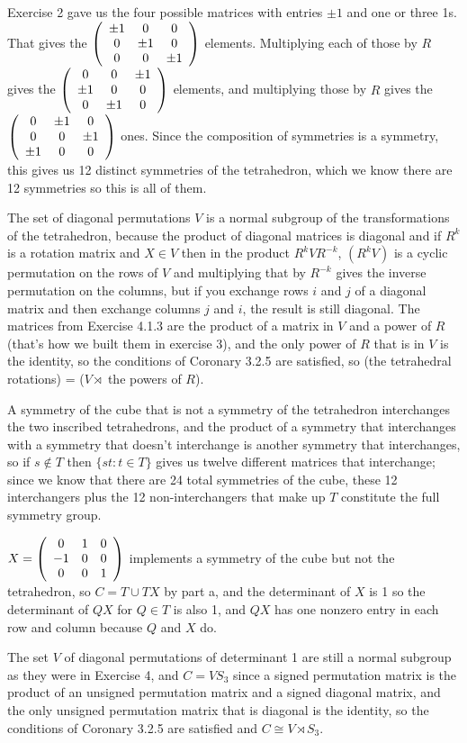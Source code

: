 \documentclass[11pt, oneside]{article}   	%
\begin{document}
\item Exercise 2 gave us the four possible matrices with entries $\pm 1$ and one or three 1s. That gives the $\left( \begin{array}{ccc} \pm1 & 0 & 0 \\ 0 & \pm 1 & 0 \\ 0 & 0 & \pm 1 \end{array} \right)$ elements. Multiplying each of those by $R$ gives the $\left( \begin{array}{ccc} 0 & 0 & \pm1 \\ \pm1 & 0 & 0 \\ 0 & \pm1 & 0 \end{array} \right)$ elements, and multiplying those by $R$ gives the $\left( \begin{array}{ccc} 0 & \pm1 & 0 \\ 0 & 0 & \pm1 \\ \pm1 & 0 & 0 \end{array} \right)$ ones. Since the composition of symmetries is a symmetry, this gives us 12 distinct symmetries of the tetrahedron, which we know there are 12 symmetries so this is all of them.
\item The set of diagonal permutations $V$ is a normal subgroup of the transformations of the tetrahedron, because the product of diagonal matrices is diagonal and if $R^k$ is a rotation matrix and $X \in V$ then in the product $R^kVR^{-k}$, $(R^kV)$ is a cyclic permutation on the rows of $V$ and multiplying that by $R^{-k}$ gives the inverse permutation on the columns, but if you exchange rows $i$ and $j$ of a diagonal matrix and then exchange columns $j$ and $i$, the result is still diagonal. The matrices from Exercise 4.1.3 are the product of a matrix in $V$ and a power of $R$ (that's how we built them in exercise 3), and the only power of $R$ that is in $V$ is the identity, so the conditions of Coronary 3.2.5 are satisfied, so (the tetrahedral rotations) = ($V \rtimes$ the powers of $R$).
\item \be
\item A symmetry of the cube that is not a symmetry of the tetrahedron interchanges the two inscribed tetrahedrons, and the product of a symmetry that interchanges with a symmetry that doesn't interchange is another symmetry that interchanges, so if $s\not\in T$ then $\{st : t \in T\}$ gives us twelve different matrices that interchange; since we know that there are 24 total symmetries of the cube, these 12 interchangers plus the 12 non-interchangers that make up $T$ constitute the full symmetry group.
\item $X = \left( \begin{array}{ccc} 0 & 1 & 0 \\ -1 & 0 & 0 \\ 0 & 0 & 1 \end{array} \right)$ implements a symmetry of the cube but not the tetrahedron, so $C = T \cup TX$ by part a, and the determinant of $X$ is 1 so the determinant of $QX$ for $Q \in T$ is also 1, and $QX$ has one nonzero entry in each row and column because $Q$ and $X$ do.
\item The set $V$ of diagonal permutations of determinant 1 are still a normal subgroup as they were in Exercise 4, and $C = V S_3$ since a signed permutation matrix is the product of an unsigned permutation matrix and a signed diagonal matrix, and the only unsigned permutation matrix that is diagonal is the identity, so the conditions of Coronary 3.2.5 are satisfied and $C \cong V \rtimes S_3$.
\end{document}
